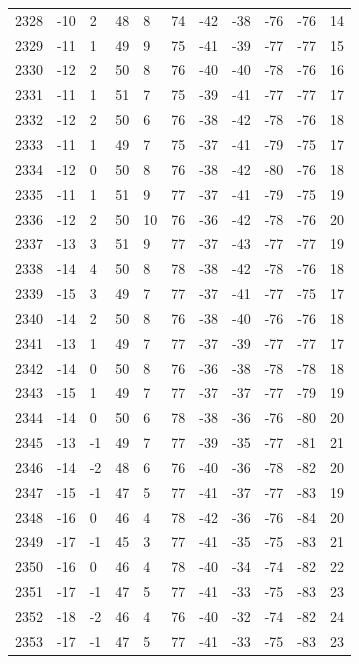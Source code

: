 \begin{table}[H]
\begin{tabular}{lllllllllll}
2328 & -10 & 2 & 48 & 8 & 74 & -42 & -38 & -76 & -76 & 14 \\
2329 & -11 & 1 & 49 & 9 & 75 & -41 & -39 & -77 & -77 & 15 \\
2330 & -12 & 2 & 50 & 8 & 76 & -40 & -40 & -78 & -76 & 16 \\
2331 & -11 & 1 & 51 & 7 & 75 & -39 & -41 & -77 & -77 & 17 \\
2332 & -12 & 2 & 50 & 6 & 76 & -38 & -42 & -78 & -76 & 18 \\
2333 & -11 & 1 & 49 & 7 & 75 & -37 & -41 & -79 & -75 & 17 \\
2334 & -12 & 0 & 50 & 8 & 76 & -38 & -42 & -80 & -76 & 18 \\
2335 & -11 & 1 & 51 & 9 & 77 & -37 & -41 & -79 & -75 & 19 \\
2336 & -12 & 2 & 50 & 10 & 76 & -36 & -42 & -78 & -76 & 20 \\
2337 & -13 & 3 & 51 & 9 & 77 & -37 & -43 & -77 & -77 & 19 \\
2338 & -14 & 4 & 50 & 8 & 78 & -38 & -42 & -78 & -76 & 18 \\
2339 & -15 & 3 & 49 & 7 & 77 & -37 & -41 & -77 & -75 & 17 \\
2340 & -14 & 2 & 50 & 8 & 76 & -38 & -40 & -76 & -76 & 18 \\
2341 & -13 & 1 & 49 & 7 & 77 & -37 & -39 & -77 & -77 & 17 \\
2342 & -14 & 0 & 50 & 8 & 76 & -36 & -38 & -78 & -78 & 18 \\
2343 & -15 & 1 & 49 & 7 & 77 & -37 & -37 & -77 & -79 & 19 \\
2344 & -14 & 0 & 50 & 6 & 78 & -38 & -36 & -76 & -80 & 20 \\
2345 & -13 & -1 & 49 & 7 & 77 & -39 & -35 & -77 & -81 & 21 \\
2346 & -14 & -2 & 48 & 6 & 76 & -40 & -36 & -78 & -82 & 20 \\
2347 & -15 & -1 & 47 & 5 & 77 & -41 & -37 & -77 & -83 & 19 \\
2348 & -16 & 0 & 46 & 4 & 78 & -42 & -36 & -76 & -84 & 20 \\
2349 & -17 & -1 & 45 & 3 & 77 & -41 & -35 & -75 & -83 & 21 \\
2350 & -16 & 0 & 46 & 4 & 78 & -40 & -34 & -74 & -82 & 22 \\
2351 & -17 & -1 & 47 & 5 & 77 & -41 & -33 & -75 & -83 & 23 \\
2352 & -18 & -2 & 46 & 4 & 76 & -40 & -32 & -74 & -82 & 24 \\
2353 & -17 & -1 & 47 & 5 & 77 & -41 & -33 & -75 & -83 & 23 \\

\end{tabular}
\end{table}
